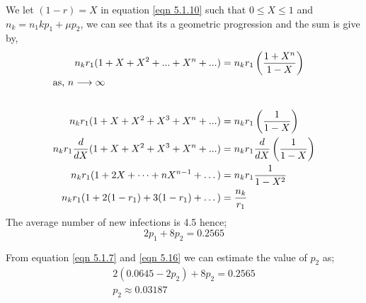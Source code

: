  We let $(1-r) = X$ in equation \ref{eqn 5.1.10} such that $0 \leq X \leq 1$ and $n_k =n_1kp_1 + \mu p_2$, we can see that its  a geometric progression and the sum is give by,
 \begin{align}
 n_k r_1 (1 + X + X^2 +...+ X^n+...) &= n_k r_1 \left(\dfrac{1 + X^n}{1 - X} \right)
 \\ \intertext{as, $n \longrightarrow \infty \nonumber$}
 \\ n_k r_1 (1 + X + X^2 + X^3+ X^n+...) &= n_k r_1 \left(\dfrac{1}{1 - X} \right)
 \\ n_k r_1 \dfrac{d}{dX}(1 + X + X^2 + X^3+ X^n+...) &= n_k r_1 \dfrac{d}{d X}\left(\dfrac{1}{1 - X} \right) 
 \\n_k r_1 ( 1 + 2X +\dots+ n X^{n-1} + \dots )&= n_k r_1   \dfrac{1}{1- X^2}
 \\ n_k r_1 ( 1 +2(1-r_1) + 3(1 -r_1) + \dots )&= \dfrac{n_k}{r_1}
 \end{align}
 The average number of new infections is 4.5 hence;
 \begin{equation}
 2p_1 + 8 p_2 = 0.2565\label{eqn 5.16}
 \end{equation}
  
 From equation \ref{eqn 5.1.7} and \ref{eqn 5.16} we can estimate the value of $p_2$ as;
 \begin{align*}
  2(0.0645 -2p_2) +8 p_2 = 0.2565
  \\p_2 \approx 0.03187
 \end{align*}
 

 